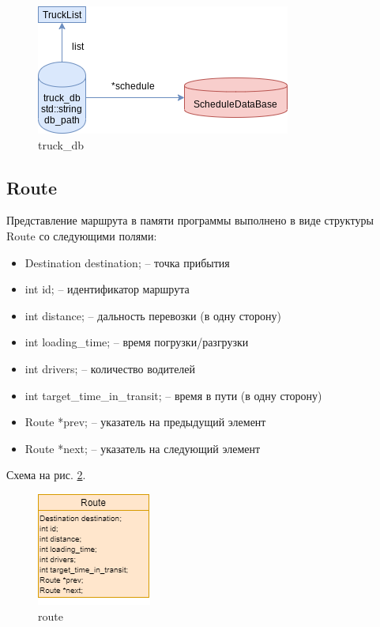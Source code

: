 \begin{figure}[H]
    \centering
    \includegraphics[width=0.4\linewidth]{photo/data_structures/truck_db}
    \caption{truck\_db}
    \label{truck_db}
\end{figure}

\subsection{Route}

Представление маршрута в памяти программы выполнено в виде структуры Route со следующими полями:

\begin{itemize}
    \item Destination destination; -- точка прибытия
    \item int id; -- идентификатор маршрута
    \item int distance; -- дальность перевозки (в одну сторону)
    \item int loading\_time; -- время погрузки/разгрузки
    \item int drivers; -- количество водителей
    \item int target\_time\_in\_transit; -- время в пути (в одну сторону)
    \item Route *prev; -- указатель на предыдущий элемент
    \item Route *next; -- указатель на следующий элемент
\end{itemize}

Схема на рис. \ref{route}.

\begin{figure}[hpt!]
    \centering
    \includegraphics[width=0.4\linewidth]{photo/data_structures/route}
    \caption{route}
    \label{route}
\end{figure}

